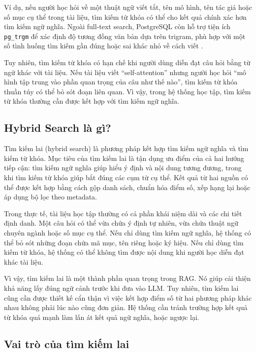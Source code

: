\documentclass[12pt,a4paper]{report}
\begin{document}
Ví dụ, nếu người học hỏi về một thuật ngữ viết tắt, tên mô hình, tên tác giả hoặc số mục cụ thể trong tài liệu, tìm kiếm từ khóa có thể cho kết quả chính xác hơn tìm kiếm ngữ nghĩa. Ngoài full-text search, PostgreSQL còn hỗ trợ tiện ích \texttt{pg\_trgm} để xác định độ tương đồng văn bản dựa trên trigram, phù hợp với một số tình huống tìm kiếm gần đúng hoặc sai khác nhỏ về cách viết \cite{postgresPgTrgmDocs}.

Tuy nhiên, tìm kiếm từ khóa có hạn chế khi người dùng diễn đạt câu hỏi bằng từ ngữ khác với tài liệu. Nếu tài liệu viết ``self-attention'' nhưng người học hỏi ``mô hình tập trung vào phần quan trọng của câu như thế nào'', tìm kiếm từ khóa thuần túy có thể bỏ sót đoạn liên quan. Vì vậy, trong hệ thống học tập, tìm kiếm từ khóa thường cần được kết hợp với tìm kiếm ngữ nghĩa.

\subsection{Hybrid Search là gì?}

Tìm kiếm lai (hybrid search) là phương pháp kết hợp tìm kiếm ngữ nghĩa và tìm kiếm từ khóa. Mục tiêu của tìm kiếm lai là tận dụng ưu điểm của cả hai hướng tiếp cận: tìm kiếm ngữ nghĩa giúp hiểu ý định và nội dung tương đương, trong khi tìm kiếm từ khóa giúp bắt đúng các cụm từ cụ thể. Kết quả từ hai nguồn có thể được kết hợp bằng cách gộp danh sách, chuẩn hóa điểm số, xếp hạng lại hoặc áp dụng bộ lọc theo metadata.

Trong thực tế, tài liệu học tập thường có cả phần khái niệm dài và các chi tiết định danh. Một câu hỏi có thể vừa chứa ý định tự nhiên, vừa chứa thuật ngữ chuyên ngành hoặc số mục cụ thể. Nếu chỉ dùng tìm kiếm ngữ nghĩa, hệ thống có thể bỏ sót những đoạn chứa mã mục, tên riêng hoặc ký hiệu. Nếu chỉ dùng tìm kiếm từ khóa, hệ thống có thể không tìm được nội dung khi người học diễn đạt khác tài liệu.

Vì vậy, tìm kiếm lai là một thành phần quan trọng trong RAG. Nó giúp cải thiện khả năng lấy đúng ngữ cảnh trước khi đưa vào LLM. Tuy nhiên, tìm kiếm lai cũng cần được thiết kế cẩn thận vì việc kết hợp điểm số từ hai phương pháp khác nhau không phải lúc nào cũng đơn giản. Hệ thống cần tránh trường hợp kết quả từ khóa quá mạnh làm lấn át kết quả ngữ nghĩa, hoặc ngược lại.

\subsection{Vai trò của tìm kiếm lai}
\end{document}
